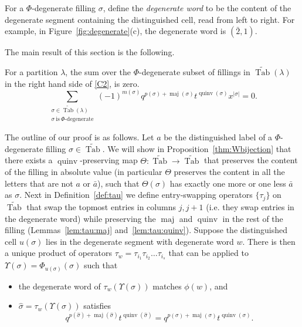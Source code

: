 \documentclass[ALCO,Unicode]{cedram}
\DeclareMathOperator{\PQT}{Tab}
\DeclareMathOperator{\maj}{maj}
\DeclareMathOperator{\quinv}{quinv}
\begin{document}
\begin{defn}For a $\Phi$-degenerate filling $\sigma$, define the \emph{degenerate word} to be the content of the degenerate segment containing the distinguished cell, read from left to right. For example, in Figure~\ref{fig:degenerate}(c), the degenerate word is $(\bar{2},1)$.
\end{defn}

The main result of this section is the following.

\begin{theorem}
\label{prop:Phi-degenerate}
For a partition $\lambda$, the sum over the $\Phi$-degenerate subset of fillings in $\widetilde{\PQT}(\lambda)$ in the right hand side of \eqref{C2}, is zero.
\[
\sum_{\substack{\sigma\in\widetilde{\PQT}(\lambda)\\\sigma\ \text{is}\ \Phi\text{-degenerate}}} (-1)^{m(\sigma)} q^{p(\sigma)+\maj(\sigma)}t^{\quinv(\sigma)}x^{|\sigma|} =0.
\]
\end{theorem} 


The outline of our proof is as follows. Let $a$ be the distinguished label of a $\Phi$-degenerate filling $\sigma\in\widetilde{\PQT}$. We will show in Proposition~\ref{thm:Wbijection} that there exists a $\quinv$-preserving map $\Theta:\widetilde{\PQT}\rightarrow \widetilde{\PQT}$ that preserves the content of the filling in absolute value (in particular $\Theta$ preserves the content in all the letters that are not $a$ or $\bar{a}$), such that $\Theta(\sigma)$ has exactly one more or one less $\bar{a}$ as $\sigma$. Next in Definition~\ref{def:tau} we define entry-swapping operators $\{\tau_j\}$ on $\widetilde{\PQT}$ that swap the topmost entries in columns $j,j+1$ (i.e. they swap entries in the degenerate word) while preserving the $\maj$ and $\quinv$ in the rest of the filling (Lemmas~\ref{lem:tau:maj} and~\ref{lem:tau:quinv}). Suppose the distinguished cell $u(\sigma)$ lies in the degenerate segment with degenerate word $w$. There is then a unique product of operators $\tau_w=\tau_{i_1}\tau_{i_2}\ldots\tau_{i_s}$ that can be applied to $\Upsilon(\sigma)=\Phi_{u(\sigma)}(\sigma)$ such that
\begin{itemize}
\item the degenerate word of $\tau_w(\Upsilon(\sigma))$ matches $\phi(w)$, and 
\item $\widehat{\sigma} = \tau_w(\Upsilon(\sigma))$ satisfies 
\[q^{p(\widehat{\sigma})+\maj(\widehat{\sigma})}t^{\quinv(\widehat{\sigma})} = q^{p(\sigma)+\maj(\sigma)}t^{\quinv(\sigma)}.\]
\end{itemize}
\end{document}
